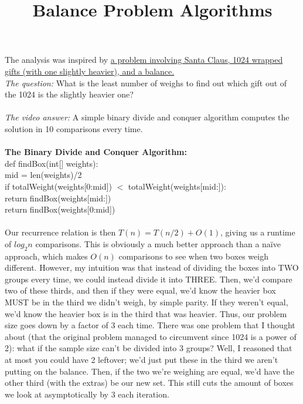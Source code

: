 \documentclass[11pt]{article}
\title{Balance Problem Algorithms}
\author{\Name}
\begin{document}
The analysis was inspired by \href{https://www.youtube.com/watch?v=wVPCT1VjySA}{a problem involving Santa Claus, 1024 wrapped gifts (with one slightly heavier), and a balance.}\\
 
\textit{The question:} What is the least number of weighs to find out which gift out of the 1024 is the slightly heavier one? \\\\
\indent\textit{The video answer:} A simple binary divide and conquer algorithm computes the solution in 10 comparisons every time. \\\\
\textbf{The Binary Divide and Conquer Algorithm:} \\
def findBox(int[] weights):\\
\indent mid = len(weights)/2\\
\indent if totalWeight(weights[0:mid]) $<$ totalWeight(weights[mid:]):\\
\indent \indent	return findBox(weights[mid:])\\
\indent	return findBox(weights[0:mid])\\\\
\newline
\indent Our recurrence relation is then $T(n) = T(n/2) + O(1)$, giving us a runtime of $log_2{n}$ comparisons. This is obviously a much better approach than a naïve approach, which makes $O(n)$ comparisons to see when two boxes weigh different. 
\newline \newline
\indent However, my intuition was that instead of dividing the boxes into TWO groups every time, we could instead divide it into THREE. Then, we’d compare two of these thirds, and then if they were equal, we’d know the heavier box MUST be in the third we didn’t weigh, by simple parity. If they weren’t equal, we’d know the heavier box is in the third that was heavier. Thus, our problem size goes down by a factor of 3 each time. There was one problem that I thought about (that the original problem managed to circumvent since 1024 is a power of 2): what if the sample size can’t be divided into 3 groups? Well, I reasoned that at most you could have 2 leftover; we’d just put these in the third we aren’t putting on the balance. Then, if the two we’re weighing are equal, we’d have the other third (with the extras) be our new set. This still cuts the amount of boxes we look at asymptotically by 3 each iteration. \\\\
\end{document}
